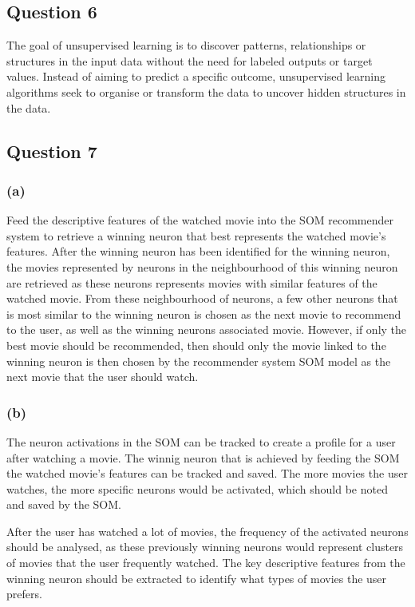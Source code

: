 \documentclass[10pt]{article}
\begin{document}
\subsection*{Question 6}

The goal of unsupervised learning is to discover patterns, relationships or structures in the input data
without the need for labeled outputs or target values. Instead of aiming to predict a specific outcome,
unsupervised learning algorithms seek to organise or transform the data to uncover hidden structures
in the data.

\subsection*{Question 7}

\subsubsection*{(a)}

Feed the descriptive features of the watched movie into the SOM recommender system to retrieve
a winning neuron that best represents the watched movie's features. After the winning neuron
has been identified for the winning neuron, the movies represented by neurons in the neighbourhood
of this winning neuron are retrieved as these neurons represents movies with similar
features of the watched movie. From these neighbourhood of neurons, a few other neurons
that is most similar to the winning neuron is chosen as the next movie to recommend to the user, as
well as the winning neurons associated movie. However, if only the best movie should be recommended,
then should only the movie linked to the winning
neuron is then chosen by the recommender system SOM model as the next movie that the user should watch.

\subsubsection*{(b)}

The neuron activations in the SOM can be tracked to create a profile for a user after watching a movie.
The winnig neuron that is achieved by feeding the SOM the watched movie's features can be tracked and
saved. The more movies the user watches, the more specific neurons would be activated, which should
be noted and saved by the SOM.

After the user has watched a lot of movies, the frequency of the activated neurons should be analysed,
as these previously winning neurons would represent clusters of movies that the user frequently watched.
The key descriptive features from the winning neuron should be extracted to identify what types of movies
the user prefers.
\end{document}
